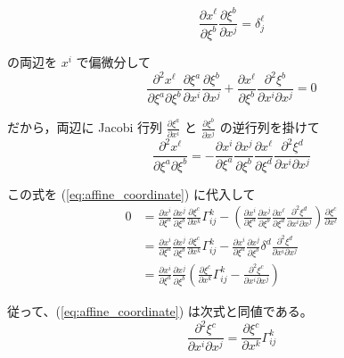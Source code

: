 \documentclass[a4paper,11pt]{jsarticle}
\numberwithin{equation}{section}
\begin{document}
\begin{equation}
    \frac{\partial x^\ell}{\partial \xi^b} \frac{\partial \xi^b}{\partial x^j} = \delta^\ell_j
    \end{equation}
    
    の両辺を $x^i$ で偏微分して
    \begin{equation}
    \frac{\partial^2 x^\ell}{\partial \xi^a \partial \xi^b} \frac{\partial \xi^a}{\partial x^i} \frac{\partial \xi^b}{\partial x^j} + \frac{\partial x^\ell}{\partial \xi^b} \frac{\partial^2 \xi^b}{\partial x^i \partial x^j} = 0
    \end{equation}
    
    だから，両辺に Jacobi 行列 $\frac{\partial \xi^a}{\partial x^i}$ と $\frac{\partial \xi^b}{\partial x^j}$ の逆行列を掛けて
    \begin{equation}
    \frac{\partial^2 x^\ell}{\partial \xi^a \partial \xi^b} = -\frac{\partial x^i}{\partial \xi^a} \frac{\partial x^j}{\partial \xi^b} \frac{\partial x^\ell}{\partial \xi^d} \frac{\partial^2 \xi^d}{\partial x^i \partial x^j}
    \end{equation}
    
    この式を (\ref{eq:affine_coordinate}) に代入して
    \begin{align}
    0 &= \frac{\partial x^i}{\partial \xi^a} \frac{\partial x^j}{\partial \xi^b} \frac{\partial \xi^c}{\partial x^k} \Gamma^k_{ij} - \left( \frac{\partial x^i}{\partial \xi^a} \frac{\partial x^j}{\partial \xi^b} \frac{\partial x^\ell}{\partial \xi^d} \frac{\partial^2 \xi^d}{\partial x^i \partial x^j} \right) \frac{\partial \xi^c}{\partial x^\ell} \\
    &= \frac{\partial x^i}{\partial \xi^a} \frac{\partial x^j}{\partial \xi^b} \frac{\partial \xi^c}{\partial x^k} \Gamma^k_{ij} - \frac{\partial x^i}{\partial \xi^a} \frac{\partial x^j}{\partial \xi^b} \delta^d \frac{\partial^2 \xi^d}{\partial x^i \partial x^j} \\
    &= \frac{\partial x^i}{\partial \xi^a} \frac{\partial x^j}{\partial \xi^b} \left( \frac{\partial \xi^c}{\partial x^k} \Gamma^k_{ij} - \frac{\partial^2 \xi^c}{\partial x^i \partial x^j} \right)
    \end{align}
    
    従って、(\ref{eq:affine_coordinate}) は次式と同値である。
    \begin{equation}
    \frac{\partial^2 \xi^c}{\partial x^i \partial x^j} = \frac{\partial \xi^c}{\partial x^k} \Gamma^k_{ij}
    \end{equation}
    
\end{document}

